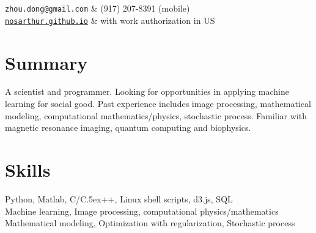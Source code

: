 \documentclass[centered,11pt,overlapped]{res}
\def\Cplusplus{{\rm C\raise.5ex\hbox{\small ++}}}
\begin{document}


\begin{resume}

\begin{ncolumn}{2}
   {\tt zhou.dong@gmail.com} &  (917) 207-8391 (mobile) \\
   {\tt \href{nosarthur.github.io}{nosarthur.github.io}} &  with work authorization in US
\end{ncolumn}


\section{\sc Summary}
A scientist and programmer. 
Looking for opportunities in applying machine learning for social good.
Past experience includes image processing, mathematical modeling, computational mathematics/physics, stochastic process. Familiar with magnetic resonance imaging, quantum computing and biophysics.


\section{\sc Skills}
Python, Matlab, C/\Cplusplus, Linux shell scripts, d3.js, SQL \\
Machine learning, Image processing, computational physics/mathematics\\
Mathematical modeling, Optimization with regularization, Stochastic process 
\end{resume}
\end{document}

